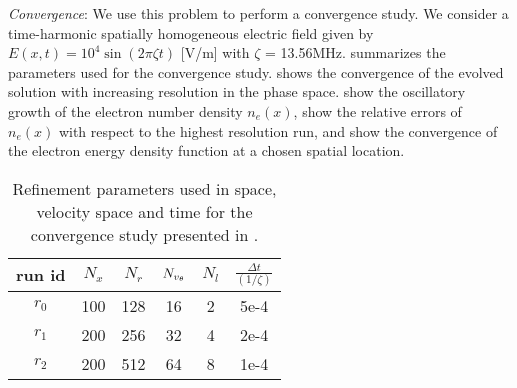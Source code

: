 \textit{Convergence}: We use this problem to perform a convergence study. We consider a time-harmonic spatially homogeneous electric field given by $E(x, t) = 10^4 \sin(2\pi \zeta t)$ [V/m] with $\zeta$ = 13.56MHz.  summarizes the parameters used for the convergence study.  shows the convergence of the evolved solution with increasing resolution in the phase space.   show the oscillatory growth of the electron number density $n_e(x)$,  show the relative errors of $n_e(x)$ with respect to the highest resolution run, and  show the convergence of the electron energy density function at a chosen spatial location. 
\begin{table}[!tbhp]
    \centering
    \begin{tabular}{|c|c|c|c|c|c|}
        \hline
        run id & $N_x$ & $N_r$ & $N_{{v_{\theta}}}$ & $N_{l}$ & $\frac{\Delta t}{(1/\zeta)}$ \\
        \hline
        $r_0$ & 100 & 128 & 16 & 2 & 5e-4 \\
        $r_1$ & 200 & 256 & 32 & 4 & 2e-4 \\
        $r_2$ & 200 & 512 & 64 & 8 & 1e-4 \\
        \hline 
    \end{tabular}
    \caption{Refinement parameters used in space, velocity space and time for the convergence study presented in . \label{tab:refinement_params}}
\end{table}

